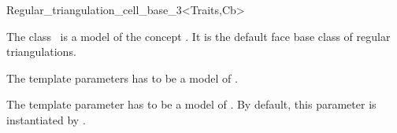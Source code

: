 

\begin{ccRefClass}{Regular_triangulation_cell_base_3<Traits,Cb>}  %


\ccDefinition  
The class \ccRefName\ is a model of the concept
. It is the default face base class
of regular triangulations.



\ccParameters
The template parameters  has to be a model
of .

The template parameter  has to be a model
of . By default, this parameter is
instantiated by
.


\ccIsModel
{}

\ccInheritsFrom
{}

\ccSeeAlso
{} \\
 \\


\end{ccRefClass}


